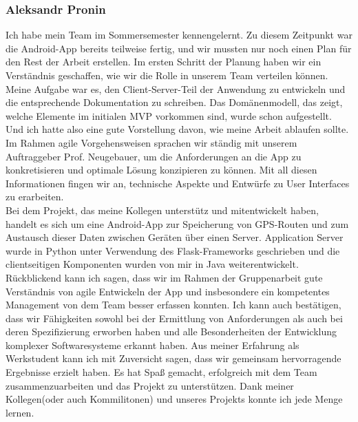 \documentclass{article}
\begin{document}
\subsubsection{Aleksandr Pronin}
    Ich habe mein Team im Sommersemester kennengelernt. Zu diesem Zeitpunkt war die Android-App bereits teilweise fertig, 
    und wir mussten nur noch einen Plan für den Rest der Arbeit erstellen.
    Im ersten Schritt der Planung haben wir ein Verständnis geschaffen, wie wir die Rolle in unserem Team verteilen können. 
    Meine Aufgabe war es, den Client-Server-Teil der Anwendung zu entwickeln und die entsprechende Dokumentation zu schreiben. 
    Das Domänenmodell, das zeigt, welche Elemente im initialen MVP vorkommen sind, wurde schon aufgestellt.
    Und ich hatte also eine gute Vorstellung davon, wie meine Arbeit ablaufen sollte.  Im Rahmen agile Vorgehensweisen 
    sprachen wir ständig mit unserem Auftraggeber Prof. Neugebauer, um die Anforderungen an die App zu 
    konkretisieren und optimale Lösung konzipieren zu können. Mit all diesen Informationen fingen wir an, technische Aspekte 
    und Entwürfe zu User Interfaces zu erarbeiten. \\
    Bei dem Projekt, das meine Kollegen unterstütz und mitentwickelt haben, handelt es sich um eine Android-App zur 
    Speicherung von GPS-Routen und zum Austausch dieser Daten zwischen Geräten über einen Server. Application Server wurde
    in Python unter Verwendung des Flask-Frameworks geschrieben und die clientseitigen Komponenten wurden von mir 
    in Java weiterentwickelt. Rückblickend kann ich sagen, dass wir im Rahmen der Gruppenarbeit  gute Verständnis von agile 
    Entwickeln der App  und insbesondere ein kompetentes Management von dem Team besser erfassen konnten. Ich kann auch bestätigen,
    dass wir Fähigkeiten sowohl bei der Ermittlung von Anforderungen als auch bei deren Spezifizierung erworben haben und alle
    Besonderheiten der Entwicklung komplexer Softwaresysteme erkannt haben. Aus meiner Erfahrung als Werkstudent kann ich mit Zuversicht sagen,
    dass wir gemeinsam hervorragende Ergebnisse erzielt haben. Es hat Spaß gemacht, erfolgreich mit dem Team zusammenzuarbeiten und das Projekt zu 
    unterstützen. Dank meiner Kollegen(oder auch Kommilitonen) und unseres Projekts konnte ich jede Menge lernen.
\end{document}
